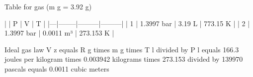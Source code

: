 Table for gas (m g = 3.92 g)  

|   | P      | V       | T       |  
|---|--------|---------|---------|  
| 1 | 1.3997 bar | 3.19 L | 773.15 K |  
| 2 | 1.3997 bar | 0.0011 m³ | 273.153 K |  

Ideal gas law  
V z equals R g times m g times T l divided by P l equals 166.3 joules per kilogram times 0.003942 kilograms times 273.153 divided by 139970 pascals equals 0.0011 cubic meters